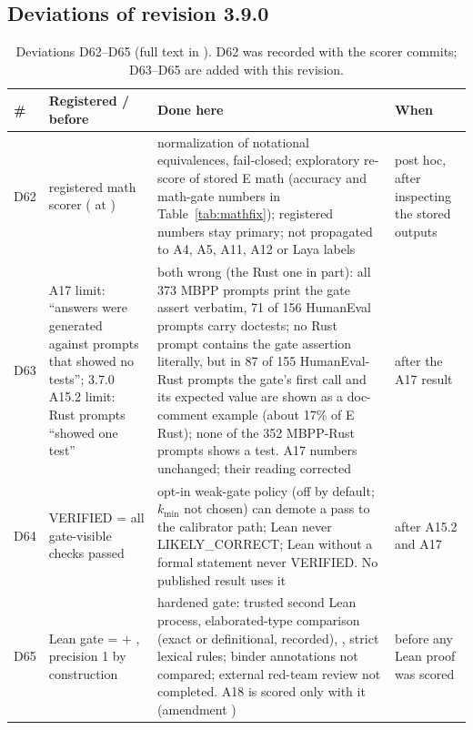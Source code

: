 \documentclass[11pt,a4paper]{article}
\newcommand{\code}[1]{\texttt{\detokenize{#1}}}
\begin{document}
\begin{table}[!htbp]\centering
\caption{Ledger lines added since 3.6.0. By name, \code{rf-*} are the R$'$ generations (\code{-9b-} on the four-chip slice) and \code{laya-pred-r} the Laya prediction on R$'$; inferred from the names, not checked against the VM logs.}\label{tab:rfresh-spend}

\end{table}

\subsection{Deviations of revision 3.9.0}

\begin{table}[!htbp]\centering\scriptsize\setlength{\tabcolsep}{4pt}
\caption{Deviations D62--D65 (full text in \code{docs/DEVIATIONS.md}). D62 was recorded with the scorer commits; D63--D65 are added with this revision.}
\label{tab:dev39}
\begin{tabular}{l p{4.0cm} p{6.8cm} p{2.0cm}}\toprule
\# & Registered / before & Done here & When\\\midrule
D62 & registered math scorer (\code{math_check.py} at \code{78cf88b}) & normalization of notational equivalences, fail-closed; exploratory re-score of stored E math (accuracy and math-gate numbers in Table~\ref{tab:mathfix}); registered numbers stay primary; not propagated to A4, A5, A11, A12 or Laya labels & post hoc, after inspecting the stored outputs\\
D63 & A17 limit: ``answers were generated against prompts that showed no tests''; 3.7.0 A15.2 limit: Rust prompts ``showed one test'' & both wrong (the Rust one in part): all 373 MBPP prompts print the gate assert verbatim, 71 of 156 HumanEval prompts carry doctests; no Rust prompt contains the gate assertion literally, but in 87 of 155 HumanEval-Rust prompts the gate's first call and its expected value are shown as a doc-comment example (about 17\% of E Rust); none of the 352 MBPP-Rust prompts shows a test. A17 numbers unchanged; their reading corrected & after the A17 result\\
D64 & VERIFIED = all gate-visible checks passed & opt-in weak-gate policy (off by default; $k_{\min}$ not chosen) can demote a pass to the calibrator path; Lean never LIKELY\_CORRECT; Lean without a formal statement never VERIFIED. No published result uses it & after A15.2 and A17\\
D65 & Lean gate = \code{lake env lean} + \code{\#print axioms}, precision 1 by construction & hardened gate: trusted second Lean process, elaborated-type comparison (exact or definitional, recorded), \code{collectAxioms}, strict lexical rules; binder annotations not compared; external red-team review not completed. A18 is scored only with it (amendment \code{f318f71}) & before any Lean proof was scored\\
\bottomrule\end{tabular}\end{table}
\end{document}
